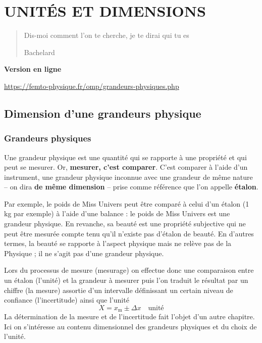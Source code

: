 \setchapterpreamble[u]{\margintoc}
\chapter{UNITÉS ET DIMENSIONS}


\blockquote[Bachelard]{Dis-moi comment l'on te cherche, je te dirai qui tu es}

\begin{center}
\textbf{Version en ligne}

\url{https://femto-physique.fr/omp/grandeurs-physiques.php}
\end{center}

\section[Dimension d'une grandeur]{Dimension d'une grandeurs physique}
\subsection{Grandeurs physiques}
Une grandeur physique est une quantité qui se rapporte à une propriété  et qui peut se mesurer. Or, \textbf{mesurer, c'est comparer}. C'est comparer à l'aide d'un instrument, une grandeur physique inconnue avec une grandeur de même nature -- on dira\textbf{ de même dimension} -- prise comme référence que l'on appelle \textbf{étalon}. 

Par exemple, le poids de Miss Univers peut être comparé à celui d'un étalon (1 kg par exemple) à l'aide d'une balance : le poids de Miss Univers est une grandeur physique. En revanche, sa beauté est une propriété subjective qui ne peut être mesurée compte tenu qu'il n'existe pas d'étalon de beauté. En d'autres termes, la beauté se rapporte à l'aspect physique mais ne relève pas de la Physique ; il ne s'agit pas d'une grandeur physique.

Lors du processus de mesure (mesurage) on effectue donc une comparaison entre un étalon (l'unité) et la grandeur à mesurer puis  l'on traduit le résultat par un chiffre (la mesure) assortie d'un intervalle définissant un certain niveau de confiance (l'incertitude) ainsi que l'unité
\[
X=x_\text{m}\pm\Delta x\quad\text{unité}
\] 
La détermination de la mesure et de l'incertitude fait l'objet d'un autre chapitre. Ici on s'intéresse au contenu dimensionnel des grandeurs physiques et du choix de l'unité.

